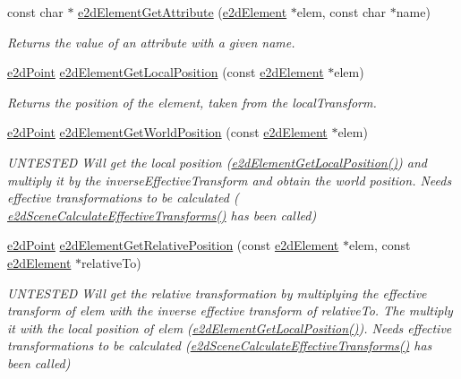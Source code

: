 \begin{DoxyCompactItemize}
const char $\ast$ \hyperlink{group__e2dElement_gac32ea8a33b317fc014929102d64ac157}{e2d\-Element\-Get\-Attribute} (\hyperlink{structe2dElement}{e2d\-Element} $\ast$elem, const char $\ast$name)
\begin{DoxyCompactList}\small\item\em Returns the value of an attribute with a given name. \end{DoxyCompactList}\item 
\hyperlink{structe2dPoint}{e2d\-Point} \hyperlink{group__e2dElement_ga39dd883e42f609efba3f75300a29ff31}{e2d\-Element\-Get\-Local\-Position} (const \hyperlink{structe2dElement}{e2d\-Element} $\ast$elem)
\begin{DoxyCompactList}\small\item\em Returns the position of the element, taken from the local\-Transform. \end{DoxyCompactList}\item 
\hyperlink{structe2dPoint}{e2d\-Point} \hyperlink{group__e2dElement_ga9b85de42e52c0d89e82f9231ea923c8c}{e2d\-Element\-Get\-World\-Position} (const \hyperlink{structe2dElement}{e2d\-Element} $\ast$elem)
\begin{DoxyCompactList}\small\item\em U\-N\-T\-E\-S\-T\-E\-D Will get the local position (\hyperlink{group__e2dElement_ga39dd883e42f609efba3f75300a29ff31}{e2d\-Element\-Get\-Local\-Position()}) and multiply it by the inverse\-Effective\-Transform and obtain the world position. Needs effective transformations to be calculated ( \hyperlink{group__e2dScene_gac4b32991ff8bab5d5ae429fb97b4e26c}{e2d\-Scene\-Calculate\-Effective\-Transforms()} has been called) \end{DoxyCompactList}\item 
\hyperlink{structe2dPoint}{e2d\-Point} \hyperlink{group__e2dElement_gab4e3f4eeba31c937a946f68617c5cb06}{e2d\-Element\-Get\-Relative\-Position} (const \hyperlink{structe2dElement}{e2d\-Element} $\ast$elem, const \hyperlink{structe2dElement}{e2d\-Element} $\ast$relative\-To)
\begin{DoxyCompactList}\small\item\em U\-N\-T\-E\-S\-T\-E\-D Will get the relative transformation by multiplying the effective transform of elem with the inverse effective transform of relative\-To. The multiply it with the local position of elem (\hyperlink{group__e2dElement_ga39dd883e42f609efba3f75300a29ff31}{e2d\-Element\-Get\-Local\-Position()}). Needs effective transformations to be calculated (\hyperlink{group__e2dScene_gac4b32991ff8bab5d5ae429fb97b4e26c}{e2d\-Scene\-Calculate\-Effective\-Transforms()} has been called) \end{DoxyCompactList}\item 

\end{DoxyCompactItemize}
